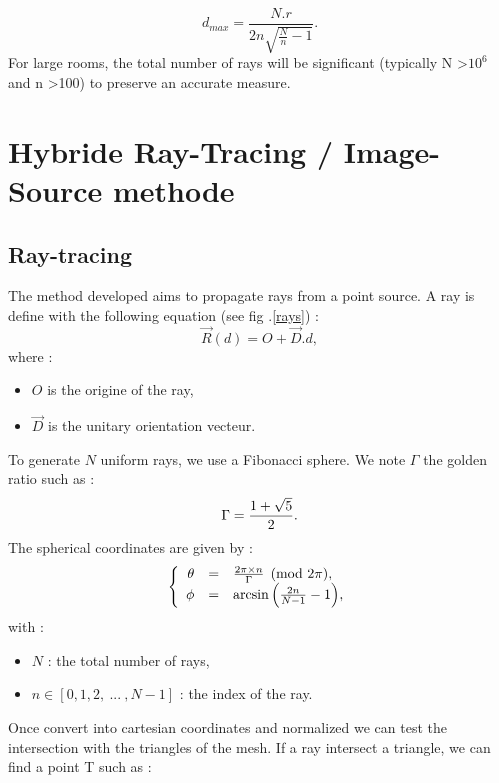 \documentclass[AMA,STIX1COL]{WileyNJD-v2}
\begin{document}
\begin{equation}
	d_{max} =  \frac{N.r}{2n\sqrt{\frac{N}{n}-1}}.
\end{equation}
%
For large rooms, the total number of rays will be significant (typically N >$10^6$ and n >100) to preserve an accurate measure.







\section{Hybride Ray-Tracing / Image-Source methode}\label{sec3}
\subsection{Ray-tracing}

The method developed aims to propagate rays from a point source. A ray is define with the following equation (see fig .\ref{rays}) :
\begin{equation}
\overrightarrow{R}(d) = O + \overrightarrow{D}.d,
\end{equation}
where :
\begin{itemize}
\item $O$ is the origine of the ray,
\item $\overrightarrow{D}$ is the unitary orientation vecteur.
\end{itemize}

To generate $N$ uniform rays, we use a Fibonacci sphere. We note $\Gamma$ the golden ratio such as :
\begin{equation}
\Gamma = \frac{1 + \sqrt{5}}{2}. \\
\end{equation}
%
The spherical coordinates are given by :
\begin{equation}
  \left \{
   \begin{array}{r c l}
\theta &=& \frac{2 \pi \times n}{\Gamma}  \pmod{2\pi},  \\
\phi &=& \arcsin{\left(\frac{2n}{N-1}-1\right)}, 
   \end{array}
   \right .
\end{equation}
%
with : 
\begin{itemize}
\item $N$ : the total number of rays,
\item $n \in[0, 1, 2, \ ... \ ,N-1]$ : the index of the ray.
\end{itemize}
%
Once convert into cartesian coordinates and normalized we can test the intersection with the triangles of the mesh. If a ray intersect a triangle, we can find a point T such as :
\end{document}
